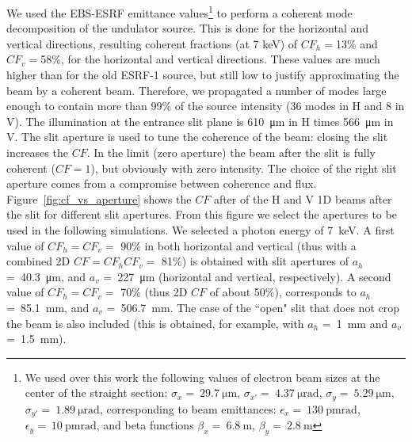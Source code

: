 \documentclass{iucr}              %
\begin{document}
We used the EBS-ESRF emittance values\footnote{We used over this work the following values of electron beam sizes at the center of the straight section: $\sigma_x=~\SI{29.7}{\micro\meter}$,
$\sigma_{x'}=~\SI{4.37}{\micro\radian}$,
$\sigma_y=~\SI{5.29}{\micro\meter}$,
$\sigma_{y'}=~\SI{1.89}{\micro\radian}$, corresponding to beam emittances:  $\epsilon_x=~\SI{130}{\pico\meter \radian}$,
$\epsilon_y=~\SI{10}{\pico\meter \radian}$, and beta functions
$\beta_x=~\SI{6.8}{\meter}$,
$\beta_y=~\SI{2.8}{\meter}$
}
to perform a coherent mode decomposition of the undulator source.
This is done for the horizontal and vertical directions, resulting coherent fractions (at 7 keV) of $CF_h=$13\% and $CF_v=$58\%, for the horizontal and vertical directions. These values are much higher than for the old ESRF-1 source, but still low to justify approximating the beam by a coherent beam. Therefore, we propagated a number of modes large enough to contain more than 99\% of the source intensity (36 modes in H and 8 in V). The illumination at the entrance slit plane is \SI{610}{\micro\meter} in H times \SI{566}{\micro\meter} in V. The slit aperture is used to tune the coherence of the beam: closing the slit increases the $CF$. In the limit (zero aperture) the beam after the slit is fully coherent ($CF=1$), but obviously with zero intensity. The choice of the right slit aperture comes from a compromise between coherence and flux. Figure~\ref{fig:cf_vs_aperture} shows the $CF$ after of the H and V 1D beams after the slit for different slit apertures. From this figure we select the apertures to be used in the following simulations. We selected a photon energy of \SI{7}{keV}. A first value of $CF_h=CF_v=$ 90\% in both horizontal and vertical (thus with a combined 2D  $CF=CF_h CF_v=$ 81\%) is obtained with slit apertures of
$a_h$ =~\SI{40.3}{\micro\meter}, and 
$a_v$ =~\SI{227}{\micro\meter} (horizontal and vertical, respectively). A second value of  $CF_h=CF_v=$ 70\% (thus 2D $CF$ of about 50\%), corresponds to 
$a_h$ =~\SI{85.1}{\milli\meter}, and 
$a_v$ =~\SI{506.7}{\milli\meter}. The case of the ``open" slit that does not crop the beam is also included (this is obtained, for example, with $a_h$ =~\SI{1}{\milli\meter} and $a_v$ =~\SI{1.5}{\milli\meter}).
\end{document}
